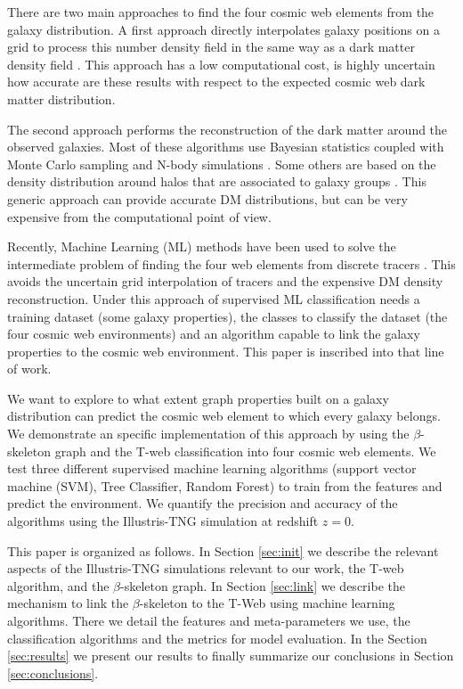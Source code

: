 \documentclass[usenatbib]{mnras}
\begin{document}
There are two main approaches to find the four cosmic web elements
from the galaxy distribution.
A first approach directly interpolates galaxy positions
on a grid to process this number density field in the same way as a dark
matter density field \citep{Eardley2015,Alpaslan2016,Tojeiro2017,Shadab2019}. 
This approach has a low computational cost, is highly uncertain how
accurate are these results with respect to the expected  cosmic web
dark matter distribution. 

The second approach performs the reconstruction of the dark matter around
the observed galaxies.
Most of these algorithms use Bayesian statistics coupled with Monte
Carlo sampling  and N-body
simulations \citep{Jasche2010,Jasche2013a,Bos2014,LeclercqJasche2015,Horowitz2019,Burchett2020}. 
Some others are based on the density distribution around halos that
are associated to galaxy groups \citep{Wang2009,2011MNRAS.417.1303M}.  
This generic approach can provide accurate DM distributions, but can
be very expensive from the computational point of view. 

Recently, Machine Learning (ML) methods have been used to solve the
intermediate problem of finding the four web elements from discrete
tracers \citep{Hui2018}. 
This avoids the uncertain grid interpolation of tracers and the expensive
DM density reconstruction.
Under this approach of supervised ML classification needs a training
dataset (some galaxy properties), the classes to classify the dataset
(the four cosmic web environments) and an algorithm capable to link
the galaxy properties to the cosmic web environment.
This paper is inscribed into that line of work.


We want to explore to what extent graph properties built on a galaxy
distribution can predict the cosmic web element to which every galaxy
belongs. 
We demonstrate an specific implementation of this approach by using
the $\beta$-skeleton graph \citep{Fang2019} and the  T-web
\citep{Forero-Romero2009} classification into four cosmic web
elements.  
We test three different supervised machine learning
algorithms (support vector machine (SVM), Tree Classifier, Random Forest) 
to train from the features and predict the environment.
We quantify the precision and accuracy of the algorithms using the Illustris-TNG simulation \citep{Nelson2015} at redshift $z=0$.

This paper is organized as follows. 
In Section \ref{sec:init} we describe the relevant aspects of the Illustris-TNG
simulations relevant to our work, the T-web algorithm,
and the $\beta$-skeleton graph.
In Section \ref{sec:link} we describe the mechanism to link the
$\beta$-skeleton to the T-Web using machine learning algorithms.
There we detail the features and meta-parameters we use, the
classification algorithms and the metrics for model evaluation.  
In the Section \ref{sec:results} we present our results
to finally summarize our conclusions in Section
\ref{sec:conclusions}. 
\end{document}
